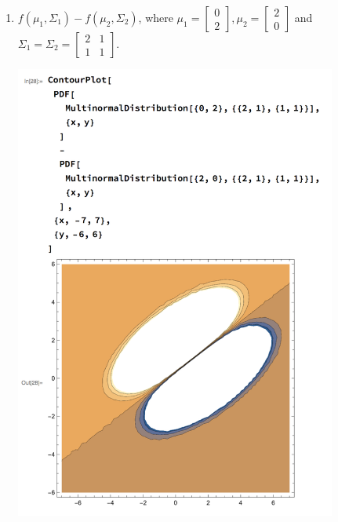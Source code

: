\begin{enumerate}[label=(\alph*)]
    \newpage
    \item $f(\mu_1, \Sigma_1) - f(\mu_2, \Sigma_2)$, where $\mu_1 = \begin{bmatrix} 0 \\ 2 \end{bmatrix}, \mu_2 = \begin{bmatrix} 2 \\ 0 \end{bmatrix}$ and $\Sigma_1 = \Sigma_2 = \begin{bmatrix} 2 & 1 \\ 1 & 1 \end{bmatrix}$.
    \begin{mdframed}
      \includegraphics[width=300pt]{img/hw03_2c.png}
    \end{mdframed}


\end{enumerate}
